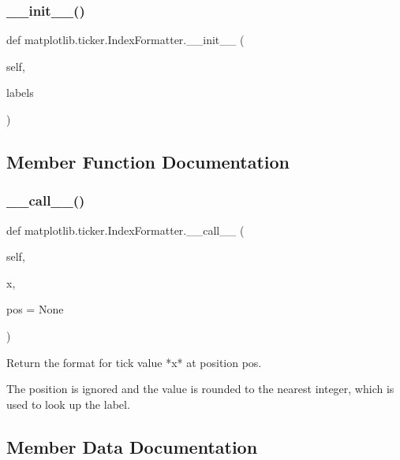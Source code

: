 \subsubsection{\texorpdfstring{\+\_\+\+\_\+init\+\_\+\+\_\+()}{\_\_init\_\_()}}
{\footnotesize\ttfamily def matplotlib.\+ticker.\+Index\+Formatter.\+\_\+\+\_\+init\+\_\+\+\_\+ (\begin{DoxyParamCaption}\item[{}]{self,  }\item[{}]{labels }\end{DoxyParamCaption})}



\subsection{Member Function Documentation}
\mbox{\label{classmatplotlib_1_1ticker_1_1IndexFormatter_af267ca534ab3bb7bd4d1578e193d60b9}} 
\subsubsection{\texorpdfstring{\+\_\+\+\_\+call\+\_\+\+\_\+()}{\_\_call\_\_()}}
{\footnotesize\ttfamily def matplotlib.\+ticker.\+Index\+Formatter.\+\_\+\+\_\+call\+\_\+\+\_\+ (\begin{DoxyParamCaption}\item[{}]{self,  }\item[{}]{x,  }\item[{}]{pos = {\ttfamily None} }\end{DoxyParamCaption})}

\begin{DoxyVerb}Return the format for tick value *x* at position pos.

The position is ignored and the value is rounded to the nearest
integer, which is used to look up the label.
\end{DoxyVerb}
 

\subsection{Member Data Documentation}
\mbox{\label{classmatplotlib_1_1ticker_1_1IndexFormatter_a8057f9b7a5bd74b844d73f31cdb20a7f}} 
